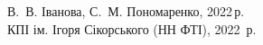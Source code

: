 {\begin{alwayssingle}
		\vfill

	\hfill
	\begin{minipage}[t]{0.5\linewidth}\small
        \textcopyright{} В.~В. Іванова, С.~М. Пономаренко, 2022\,р. \\
        \textcopyright{}  КПІ ім. Ігоря Сікорського (НН ФТІ), 2022~р.
    \end{minipage}
		\newpage%
	\end{alwayssingle}
}










